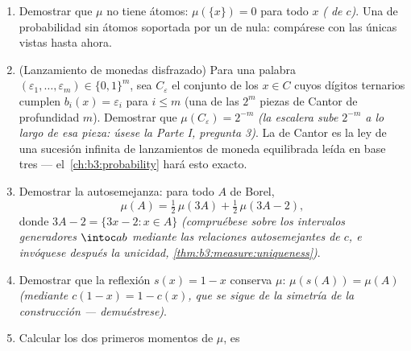 \begin{problem}
\begin{enumerate}[resume]
        $\intco1\infty$): la
        \emph{ de Cantor} $\mu$.
        Demostrar que $\mu(\R) = 1$, que todo hueco del conjunto de
        Cantor es $\mu$-nulo ($c$ es allí constante) y concluir que
        \[
        \mu(C) = 1, \qquad \lambda(C) = 0 :
        \]
        $\mu$ y $\lambda$ viven sobre soportes disjuntos ($C$ y su
        complementario). Dos  en
        esta situación se llaman \emph{mutuamente singulares}, y se
        escribe $\mu \perp
        \lambda$. \item Demostrar que $\mu$ no tiene átomos:
        $\mu(\{x\}) = 0$ para todo $x$
        \emph{( de
        $c$)}. Una  de
        probabilidad sin átomos soportada por un
         de 
        nula: compárese con las únicas
         vistas hasta ahora.
        \item (Lanzamiento de monedas disfrazado) Para una palabra
        $(\varepsilon_1,
        \dots, \varepsilon_m) \in \{0,1\}^m$, sea $C_{\varepsilon}$ el
        conjunto de los $x \in C$ cuyos dígitos ternarios cumplen
        $b_i(x) = \varepsilon_i$ para $i \leq m$ (una de las $2^m$
        piezas de Cantor de profundidad $m$). Demostrar que
        $\mu(C_\varepsilon) = 2^{-m}$ \emph{(la escalera sube $2^{-m}$ a
        lo largo de esa pieza: úsese la Parte I, pregunta 3)}. La
         de Cantor es la ley de
        una sucesión infinita de lanzamientos de moneda equilibrada
        leída en base tres --- el~\cref{ch:b3:probability} hará esto
        exacto. \item Demostrar la autosemejanza: para todo $A$ de
        Borel,
        \[
        \mu(A) = \tfrac12\,\mu(3A) +
        \tfrac12\,\mu(3A - 2) ,
        \]
        donde $3A - 2 = \{3x - 2 : x \in A\}$ \emph{(compruébese sobre
        los intervalos generadores $\intoc ab$ mediante las relaciones
        autosemejantes de $c$, e invóquese después la unicidad,
        \cref{thm:b3:measure:uniqueness})}.
  \item Demostrar que la reflexión $s(x) = 1 - x$ conserva $\mu$:
  $\mu(s(A)) = \mu(A)$ \emph{(mediante $c(1 - x) = 1 -
        c(x)$, que se sigue de la simetría de la construcción ---
  demuéstrese)}. \item Calcular los dos primeros momentos de $\mu$, es

\end{enumerate}
\end{problem}
